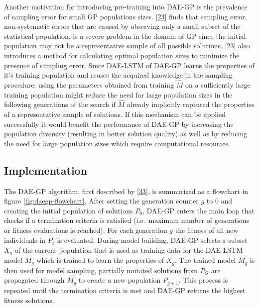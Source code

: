 \documentclass[
  11pt,
]{article}
\begin{document}
Another motivation for introducing pre-training into DAE-GP is the prevalence of sampling error for small GP populations sizes.
{[}\protect\hyperlink{ref-sampling_err_gp}{23}{]} finds that sampling error, non-systematic errors that are caused by observing only a small subset of the statistical population, is a severe problem in the domain of GP since the initial population may not be a representative sample of all possible solutions.
{[}\protect\hyperlink{ref-sampling_err_gp}{23}{]} also introduces a method for calculating optimal population sizes to minimize the presence of sampling error.
Since DAE-LSTM of DAE-GP learns the properties of it's training population and reuses the acquired knowledge in the sampling procedure, using the parameters obtained from training \(\hat{M}\) on a sufficiently large training population might reduce the need for large population sizes in the following generations of the search if \(\hat{M}\) already implicitly captured the properties of a representative sample of solutions.
If this mechanism can be applied successfully it would benefit the performance of DAE-GP by increasing the population diversity (resulting in better solution quality) as well as by reducing the need for large population sizes which require computational resources.

\hypertarget{implementation}{%
\subsection{Implementation}\label{implementation}}

The DAE-GP algorithm, first described by {[}\protect\hyperlink{ref-dae-gp_2020_rtree}{33}{]}, is summarized as a flowchart in figure \ref{fig:daegp-flowchart}.
After setting the generation counter \(g\) to \(0\) and creating the initial population of solutions \(P_0\), DAE-GP enters the main loop that checks if a termination criteria is satisfied (i.e.~maximum number of generations or fitness evaluations is reached).
For each generation \(g\) the fitness of all new individuals in \(P_g\) is evaluated. During model building, DAE-GP selects a subset \(X_g\) of the current population that is used as training data for the DAE-LSTM model \(M_g\) which is trained to learn the properties of \(X_g\).
The trained model \(M_g\) is then used for model sampling, partially mutated solutions from \(P_G\) are propagated through \(M_g\) to create a new population \(P_{g+1}\).
This process is repeated until the termination criteria is met and DAE-GP returns the highest fitness solutions.
\end{document}
